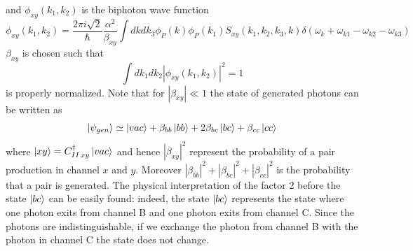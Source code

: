 and $\phi_{xy}(k_1,k_2)$ is the biphoton wave function 
\begin{equation}\label{biphoton}\phi_{xy}(k_1,k_2) = \frac{2\pi i \sqrt{2}}{\hbar} \frac{\alpha^2}{\beta_{xy}}\int dk dk_3\phi_P(k)\phi_P(k_1)S_{xy}(k_1,k_2,k_3,k)\delta(\omega_{k}+\omega_{k1}-\omega_{k2}-\omega_{k3}) \end{equation}
$\beta_{xy}$ is chosen such that
\begin{equation}\int dk_1 dk_2 |\phi_{xy}(k_1,k_2)|^2 = 1\end{equation}
is properly normalized. Note that for $|\beta_{xy}| \ll 1 $ the state of generated photons can be written as
\begin{equation}\ket{\psi_{gen}} \simeq \ket{vac} + \beta_{bb}\ket{bb}+2\beta_{bc}\ket{bc}+ \beta_{cc}\ket{cc} \end{equation}
where $\ket{xy} = C_{II\, xy}^\dagger\ket{vac}$ and hence $|\beta_{xy}|^2$ represent the probability of a pair production in channel $x$ and $y$. Moreover
$|\beta_{bb}|^2 + |\beta_{bc}|^2 +|\beta_{cc}|^2$ is the probability that a pair is generated. The physical interpretation of the factor 2 before the state $\ket{bc}$ can be easily found: indeed, the state $\ket{bc}$ represents the state where one photon exits from channel B and one photon exits from channel C. Since the photons are indistinguishable, if we exchange the photon from channel B with the photon in channel C the state does not change.

